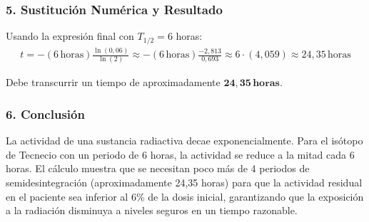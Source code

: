 \subsubsection*{5. Sustitución Numérica y Resultado}
Usando la expresión final con $T_{1/2} = 6$ horas:
\begin{gather}
    t = - (6\,\text{horas}) \frac{\ln(0,06)}{\ln(2)} \approx - (6\,\text{horas}) \frac{-2,813}{0,693} \approx 6 \cdot (4,059) \approx 24,35\,\text{horas}
\end{gather}
\begin{cajaresultado}
Debe transcurrir un tiempo de aproximadamente $\boldsymbol{24,35 \, \textbf{horas}}$.
\end{cajaresultado}

\subsubsection*{6. Conclusión}
\begin{cajaconclusion}
La actividad de una sustancia radiactiva decae exponencialmente. Para el isótopo de Tecnecio con un periodo de 6 horas, la actividad se reduce a la mitad cada 6 horas. El cálculo muestra que se necesitan poco más de 4 periodos de semidesintegración (aproximadamente 24,35 horas) para que la actividad residual en el paciente sea inferior al 6\% de la dosis inicial, garantizando que la exposición a la radiación disminuya a niveles seguros en un tiempo razonable.
\end{cajaconclusion}

\newpage
